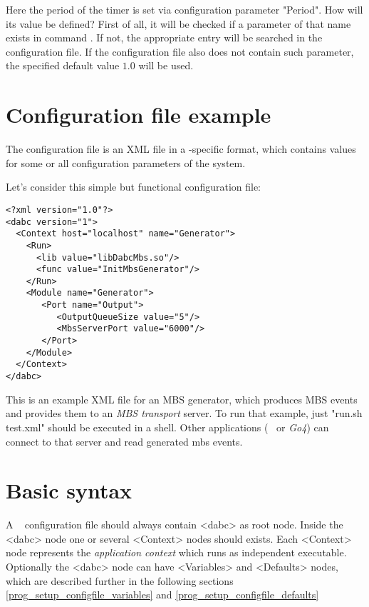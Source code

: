 Here the period of the timer is set via configuration parameter "Period". 
How will its value  be defined? 
First of all, it will be checked if a parameter of that name exists in command
. If not, the appropriate entry will be searched in the configuration file. 
If the configuration file also does not contain such parameter, 
the specified default value $1.0$  will be used.


\section{Configuration file example}
\label{prog_setup_configfile}
The configuration file is an XML file in a \dabc-specific format, 
which contains values for some or all configuration parameters of the system. 

Let's consider this simple but functional configuration file:

\begin{small}
\begin{verbatim}
<?xml version="1.0"?>
<dabc version="1">
  <Context host="localhost" name="Generator">
    <Run>
      <lib value="libDabcMbs.so"/>
      <func value="InitMbsGenerator"/>
    </Run>
    <Module name="Generator">
       <Port name="Output">
          <OutputQueueSize value="5"/>
          <MbsServerPort value="6000"/>
       </Port>
    </Module>
  </Context>
</dabc>
\end{verbatim}
\end{small}

This is an example XML file for an MBS generator, which produces 
MBS events and provides them to an {\em MBS transport} server. 
To run that example, just "run.sh test.xml" should be executed in a shell.
Other applications
(\dabc~ or {\em Go4}) can connect to that server and read generated mbs events.


\section{Basic syntax}
\label{prog_setup_configfile_syntax}
A \dabc~ configuration file should always contain <dabc> as root node. 
Inside the <dabc> node one or several <Context> nodes should exists.
Each <Context> node represents the {\em application context} which runs as
independent executable. 
Optionally the <dabc> node can have <Variables> and <Defaults> nodes, 
which are described further in the following sections  \ref{prog_setup_configfile_variables}
and \ref{prog_setup_configfile_defaults}


